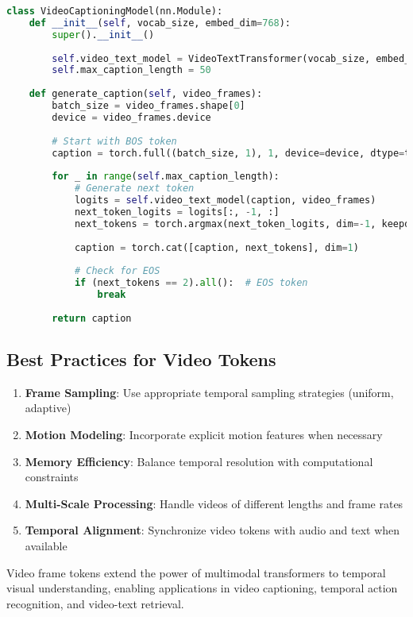 \begin{lstlisting}[language=Python, caption=Video captioning with temporal tokens]
class VideoCaptioningModel(nn.Module):
    def __init__(self, vocab_size, embed_dim=768):
        super().__init__()
        
        self.video_text_model = VideoTextTransformer(vocab_size, embed_dim)
        self.max_caption_length = 50
        
    def generate_caption(self, video_frames):
        batch_size = video_frames.shape[0]
        device = video_frames.device
        
        # Start with BOS token
        caption = torch.full((batch_size, 1), 1, device=device, dtype=torch.long)
        
        for _ in range(self.max_caption_length):
            # Generate next token
            logits = self.video_text_model(caption, video_frames)
            next_token_logits = logits[:, -1, :]
            next_tokens = torch.argmax(next_token_logits, dim=-1, keepdim=True)
            
            caption = torch.cat([caption, next_tokens], dim=1)
            
            # Check for EOS
            if (next_tokens == 2).all():  # EOS token
                break
        
        return caption
\end{lstlisting}

\subsection{Best Practices for Video Tokens}

\begin{enumerate}
\item \textbf{Frame Sampling}: Use appropriate temporal sampling strategies (uniform, adaptive)
\item \textbf{Motion Modeling}: Incorporate explicit motion features when necessary
\item \textbf{Memory Efficiency}: Balance temporal resolution with computational constraints
\item \textbf{Multi-Scale Processing}: Handle videos of different lengths and frame rates
\item \textbf{Temporal Alignment}: Synchronize video tokens with audio and text when available
\end{enumerate}

Video frame tokens extend the power of multimodal transformers to temporal visual understanding, enabling applications in video captioning, temporal action recognition, and video-text retrieval.
